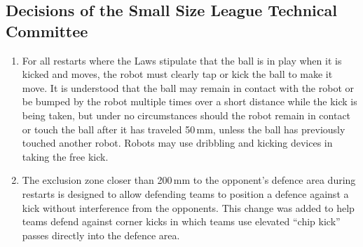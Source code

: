 \subsection*{Decisions of the Small Size League Technical Committee}
\begin{enumerate}
\item
For all restarts where the Laws stipulate that the ball is in play when it is kicked and moves, the robot must clearly tap or kick the ball to make it move.
It is understood that the ball may remain in contact with the robot or be bumped by the robot multiple times over a short distance while the kick is being taken, but under no circumstances should the robot remain in contact or touch the ball after it has traveled 50\,mm, unless the ball has previously touched another robot.
Robots may use dribbling and kicking devices in taking the free kick.

\item
The exclusion zone closer than 200\,mm to the opponent's defence area during restarts is designed to allow defending teams to position a defence against a kick without interference from the opponents.
This change was added to help teams defend against corner kicks in which teams use elevated ``chip kick'' passes directly into the defence area.
\end{enumerate}
